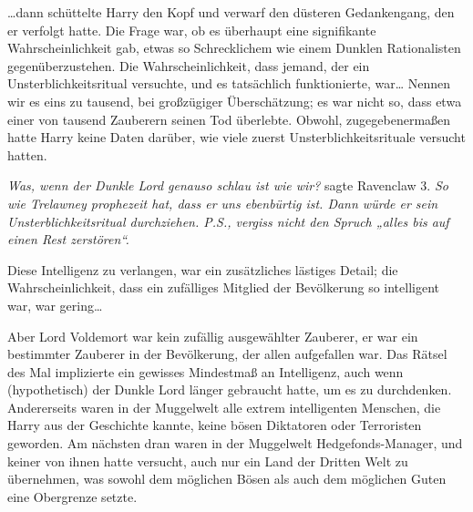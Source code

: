 …dann schüttelte Harry den Kopf und verwarf den düsteren Gedankengang, den er verfolgt hatte. Die Frage war, ob es überhaupt eine signifikante Wahrscheinlichkeit gab, etwas so Schrecklichem wie einem Dunklen Rationalisten gegenüberzustehen. Die Wahrscheinlichkeit, dass jemand, der ein Unsterblichkeitsritual versuchte, und es tatsächlich funktionierte, war… Nennen wir es eins zu tausend, bei großzügiger Überschätzung; es war nicht so, dass etwa einer von tausend Zauberern seinen Tod überlebte. Obwohl, zugegebenermaßen hatte Harry keine Daten darüber, wie viele zuerst Unsterblichkeitsrituale versucht hatten.

\emph{Was, wenn der Dunkle Lord genauso schlau ist wie wir?} sagte Ravenclaw 3. \emph{So wie Trelawney prophezeit hat, dass er uns ebenbürtig ist. Dann würde er sein Unsterblichkeitsritual durchziehen. P.S., vergiss nicht den Spruch „alles bis auf einen Rest zerstören“.}

Diese Intelligenz zu verlangen, war ein zusätzliches lästiges Detail; die Wahrscheinlichkeit, dass ein zufälliges Mitglied der Bevölkerung so intelligent war, war gering…

Aber Lord Voldemort war kein zufällig ausgewählter Zauberer, er war ein bestimmter Zauberer in der Bevölkerung, der allen aufgefallen war. Das Rätsel des Mal implizierte ein gewisses Mindestmaß an Intelligenz, auch wenn (hypothetisch) der Dunkle Lord länger gebraucht hatte, um es zu durchdenken. Andererseits waren in der Muggelwelt alle extrem intelligenten Menschen, die Harry aus der Geschichte kannte, keine bösen Diktatoren oder Terroristen geworden. Am nächsten dran waren in der Muggelwelt Hedgefonds-Manager, und keiner von ihnen hatte versucht, auch nur ein Land der Dritten Welt zu übernehmen, was sowohl dem möglichen Bösen als auch dem möglichen Guten eine Obergrenze setzte.

